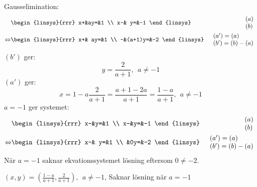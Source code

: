 \begin{task}{1.19}
	Gausselimination:
	\begin{align*}
		&\begin{linsys}{rrr}
			x+&ay=&1 \\
			x-& y=&-1
		\end{linsys}
		&\begin{array}{l}
			(a) \\
			(b)
		\end{array} \\ \lra
		&\begin{linsys}{rrr}
			x+&    ay=&1 \\
			-&(a+1)y=&-2
		\end{linsys}
		&\begin{array}{l}
			(a')=(a) \\
			(b')=(b)-(a)
		\end{array}
	\end{align*}
	$(b')$ ger:
	\[y=\frac{2}{a+1},~~a\neq-1\]
	$(a')$ ger:
	\[x=1-a\frac{2}{a+1}=\frac{a+1-2a}{a+1}=\frac{1-a}{a+1},~~a\neq-1\]
	$a=-1$ ger systemet:
	\begin{align*}
		&\begin{linsys}{rrr}
			x-&y=&1 \\
			x-&y=&-1
		\end{linsys}
		&\begin{array}{l}
			(a) \\
			(b)
		\end{array} \\ \lra
			&\begin{linsys}{rrr}
			x-& y=&1 \\
			&0y=&-2
		\end{linsys}
		&\begin{array}{l}
			(a')=(a) \\
			(b')=(b)-(a)
		\end{array}
	\end{align*}
	När $a=-1$ saknar ekvationssystemet lösning eftersom $0\neq-2$.

	\ans $(x,y)=(\frac{1-a}{a+1},\frac{2}{a+1}),~~a\neq-1$, Saknar lösning när $a=-1$
\end{task}

